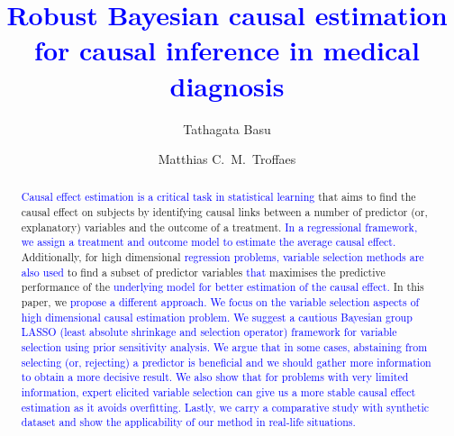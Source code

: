 \documentclass[preprint,12pt]{elsarticle}
\newcommand{\added}[1]{\textcolor{blue}{#1}}
\begin{document}
\begin{frontmatter}

\title{\added{Robust Bayesian causal estimation for causal inference in medical diagnosis}}
\author[1]{Tathagata Basu}
\author[2]{Matthias C.~M.~Troffaes}

\begin{abstract}
\added{Causal effect estimation is a critical task in statistical learning} that aims to find the causal effect on subjects
by identifying causal links between
a number of predictor (or, explanatory) variables and the outcome of a treatment. \added{In a regressional
framework, we assign a treatment and outcome model to
estimate the average causal effect.} Additionally, for high dimensional \added{regression problems, variable selection methods are also used} to find a subset of 
predictor variables \added{that} maximises the predictive performance of the \added{underlying model for better estimation of the causal effect.}  In this paper, we \added{propose a different approach. We focus on the variable selection aspects of
high dimensional causal estimation problem. We suggest a cautious
Bayesian group LASSO (least absolute shrinkage and selection operator) framework for variable selection using prior sensitivity analysis. We  argue that in some cases, abstaining from selecting (or, rejecting) a predictor is beneficial and we should gather more information to obtain a more decisive result. We also show that for problems with very limited information, expert elicited variable selection can give us a more stable causal effect estimation as it avoids overfitting. Lastly, we carry a comparative study with
synthetic dataset and show the applicability of our method in
real-life situations.}


\end{abstract}
\end{frontmatter}
\end{document}

